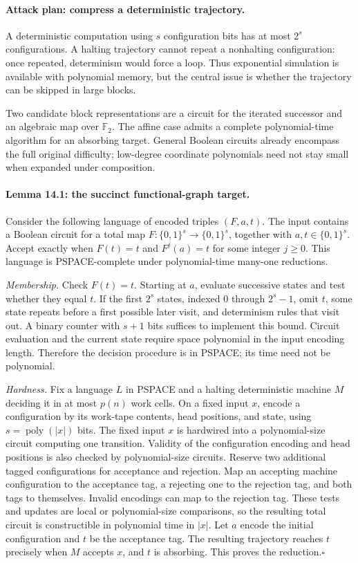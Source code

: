 \documentclass[11pt]{article}
\begin{document}
\paragraph{Attack plan: compress a deterministic trajectory.}
A deterministic computation using $s$ configuration bits has at most $2^s$
configurations. A halting trajectory cannot repeat a nonhalting configuration:
once repeated, determinism would force a loop. Thus exponential simulation
is available with polynomial memory, but the central issue is whether the
trajectory can be skipped in large blocks.

Two candidate block representations are a circuit for the iterated successor
and an algebraic map over $\mathbb F_2$. The affine case admits a complete
polynomial-time algorithm for an absorbing target. General Boolean circuits
already encompass the full original difficulty; low-degree coordinate
polynomials need not stay small when expanded under composition.

\paragraph{Lemma 14.1: the succinct functional-graph target.}
Consider the following language of encoded triples $(F,a,t)$. The input
contains a Boolean circuit for a total map
$F:\{0,1\}^s\to\{0,1\}^s$, together with $a,t\in\{0,1\}^s$.
Accept exactly when $F(t)=t$ and $F^j(a)=t$ for some integer $j\ge0$.
This language is PSPACE-complete under polynomial-time many-one reductions.

\emph{Membership.} Check $F(t)=t$. Starting at $a$, evaluate successive
states and test whether they equal $t$. If the first $2^s$ states, indexed
$0$ through $2^s-1$, omit $t$, some state repeats before a first possible
later visit, and determinism rules that visit out. A binary counter with
$s+1$ bits suffices to implement this bound. Circuit evaluation and the
current state require space polynomial in the input encoding length.
Therefore the decision procedure is in PSPACE; its time need not be
polynomial.

\emph{Hardness.} Fix a language $L$ in PSPACE and a halting deterministic
machine $M$ deciding it in at most $p(n)$ work cells. On a fixed input $x$,
encode a configuration by its work-tape contents, head positions, and state,
using $s=\operatorname{poly}(|x|)$ bits. The fixed input $x$ is hardwired
into a polynomial-size circuit computing one transition. Validity of the
configuration encoding and head positions is also checked by polynomial-size
circuits. Reserve two additional tagged configurations for acceptance and
rejection. Map an accepting machine configuration to the acceptance tag,
a rejecting one to the rejection tag, and both tags to themselves. Invalid
encodings can map to the rejection tag. These tests and updates are local
or polynomial-size comparisons, so the resulting total circuit is
constructible in polynomial time in $|x|$. Let $a$ encode the initial
configuration and $t$ be the acceptance tag. The resulting trajectory reaches
$t$ precisely when $M$ accepts $x$, and $t$ is absorbing. This proves the
reduction.\hfill$\square$
\end{document}
